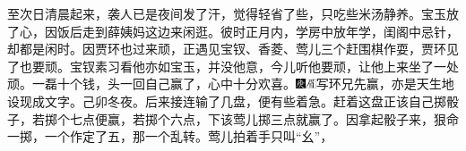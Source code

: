 至次日清晨起来，袭人已是夜间发了汗，觉得轻省了些，只吃些米汤静养。宝玉放了心，因饭后走到薛姨妈这边来闲逛。彼时正月内，学房中放年学，闺阁中忌针，却都是闲时。因贾环也过来顽，正遇见宝钗、香菱、莺儿三个赶围棋作耍，贾环见了也要顽。宝钗素习看他亦如宝玉，并没他意，今儿听他要顽，让他上来坐了一处顽。一磊十个钱，头一回自己赢了，心中十分欢喜。{\includegraphics[width=3mm]{../Images/00004}\includegraphics[width=3mm]{../Images/00010}\footnotesize \kaishu 写环兄先赢，亦是天生地设现成文字。己卯冬夜。}后来接连输了几盘，便有些着急。赶着这盘正该自己掷骰子，若掷个七点便赢，若掷个六点，下该莺儿掷三点就赢了。因拿起骰子来，狠命一掷，一个作定了五，那一个乱转。莺儿拍着手只叫“幺”，{{
}}
